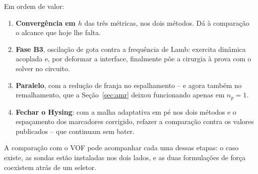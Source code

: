 Em ordem de valor:

\begin{enumerate}
  \item \textbf{Converg\^encia em $h$} das tr\^es m\'etricas, nos dois m\'etodos.
    D\'a \`a compara\c{c}\~ao o alcance que hoje lhe falta.
  \item \textbf{Fase B3}, oscila\c{c}\~ao de gota contra a frequ\^encia de Lamb:
    exercita din\^amica acoplada e, por deformar a interface, finalmente p\~oe a
    cirurgia \`a prova com o solver no circuito.
  \item \textbf{Paralelo}, com a redu\c{c}\~ao de franja no espalhamento -- e
    agora tamb\'em no remalhamento, que a Se\c{c}\~ao~\ref{sec:amr} deixou
    funcionando apenas em $n_p=1$.
  \item \textbf{Fechar o Hysing}: com a malha adaptativa em p\'e nos dois
    m\'etodos e o espa\c{c}amento dos marcadores corrigido, refazer a
    compara\c{c}\~ao contra os valores publicados -- que continuam sem bater.
\end{enumerate}

A compara\c{c}\~ao com o VOF pode acompanhar cada uma dessas etapas: o caso
existe, as sondas est\~ao instaladas nos dois lados, e as duas formula\c{c}\~oes
de for\c{c}a coexistem atr\'as de um seletor.
